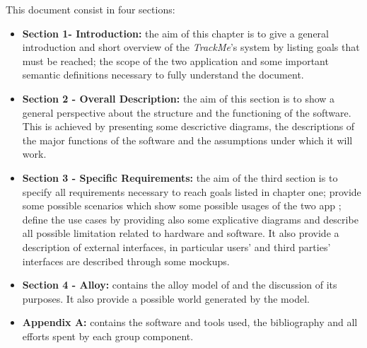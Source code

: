 This document consist in four sections:
\begin{itemize}
	\item \textbf{Section 1- Introduction:} the aim of this chapter is to give a general introduction and short overview of the 			\textit{TrackMe}'s system by listing goals that must be reached; the scope of the two application and some important semantic 		definitions necessary to fully understand the document.  
	\item \textbf{Section 2 - Overall Description:} the aim of this section is to show a general perspective about the structure and the 		functioning of the software. This is achieved by presenting some descrictive diagrams, the descriptions of the major functions of 		the software and the assumptions under which it will work.
	\item \textbf{Section 3 - Specific Requirements:} the aim of the third section is to specify all requirements necessary to reach 			goals listed in chapter one; provide some possible scenarios which show some possible usages of the two app ; define the use 			cases by providing also some explicative diagrams and describe all possible limitation related to hardware and software. It also 		provide a description of external interfaces, in particular users' and third parties' interfaces are described through some mockups.
	\item \textbf{Section 4 - Alloy:} contains the alloy model of and the discussion of its purposes. It also provide a possible world 			generated by the model.
	\item \textbf{Appendix A:} contains the software and tools used, the bibliography and all efforts spent by each group component. 
\end{itemize}